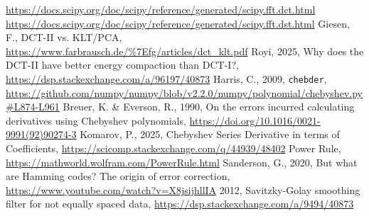 \documentclass[10pt]{article}
\begin{document}
\begin{thebibliography}{99}
	\url{https://docs.scipy.org/doc/scipy/reference/generated/scipy.fft.dct.html}
	\url{https://docs.scipy.org/doc/scipy/reference/generated/scipy.fft.dst.html}
	Giesen, F., DCT-II vs. KLT/PCA, \url{https://www.farbrausch.de/%7Efg/articles/dct_klt.pdf}
	Royi, 2025, Why does the DCT-II have better energy compaction than DCT-I?, \url{https://dsp.stackexchange.com/a/96197/40873}
	Harris, C., 2009, \texttt{chebder}, \url{https://github.com/numpy/numpy/blob/v2.2.0/numpy/polynomial/chebyshev.py#L874-L961}
	Breuer, K. \& Everson, R., 1990, On the errors incurred calculating derivatives using Chebyshev polynomials, \url{https://doi.org/10.1016/0021-9991(92)90274-3}
	Komarov, P., 2025, Chebyshev Series Derivative in terms of Coefficients, \url{https://scicomp.stackexchange.com/q/44939/48402}
	Power Rule, \url{https://mathworld.wolfram.com/PowerRule.html}
	Sanderson, G., 2020, But what are Hamming codes? The origin of error correction, \url{https://www.youtube.com/watch?v=X8jsijhllIA}
	2012, Savitzky-Golay smoothing filter for not equally spaced data, \url{https://dsp.stackexchange.com/a/9494/40873}
\end{thebibliography}
\end{document}

